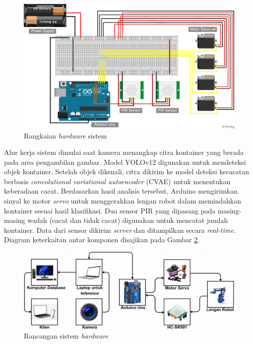 \begin{figure}[H]
  \centering
  \includegraphics[width=\textwidth]{gambar/rangkaian.jpg}
  \caption{Rangkaian \textit{hardware} sistem}
  \label{fig:rangkaian}
\end{figure}
\vspace{-1em}

Alur kerja sistem dimulai saat kamera menangkap citra kontainer yang
berada pada area pengambilan gambar. Model YOLOv12 digunakan untuk
mendeteksi objek kontainer. Setelah objek dikenali, citra dikirim ke
model deteksi kecacatan berbasis \textit{convolutional variational
autoencoder} (CVAE) untuk menentukan keberadaan cacat. Berdasarkan
hasil analisis tersebut, Arduino mengirimkan sinyal ke motor
\textit{servo} untuk menggerakkan lengan robot dalam memindahkan
kontainer sesuai
hasil klasifikasi. Dua sensor PIR yang dipasang pada masing-masing
wadah (cacat dan tidak cacat) digunakan untuk mencatat jumlah
kontainer. Data dari sensor dikirim \textit{server} dan ditampilkan
secara \textit{real-time}. Diagram  keterkaitan antar komponen
disajikan pada Gambar \ref{fig:hardware}.

\begin{figure}[H]
  \centering
  \includegraphics[width=\textwidth]{gambar/rancang.png}
  \caption{Rancangan sistem \textit{hardware}}
  \label{fig:hardware}
\end{figure}
\vspace{-1em}

